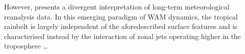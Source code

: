 \documentclass[a4paper]{article}
\begin{document}

However, \citeauthor{nicholson2009revised} \parencite{nicholson2009revised} presents a divergent interpretation of long-term meteorological reanalysis data.
In this emerging paradigm of WAM dynamics, the tropical rainbelt is largely independent of the aforedescribed surface features \parencite{grist2001study} and is characterised instead by the interaction of zonal jets operating higher in the troposphere \ldots

\end{document}
